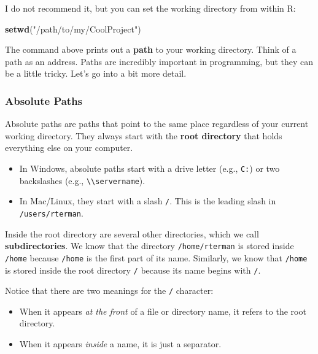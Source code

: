 \documentclass[]{book}
\newenvironment{Shaded}{\begin{snugshade}}{\end{snugshade}}
\newcommand{\KeywordTok}[1]{\textcolor[rgb]{0.13,0.29,0.53}{\textbf{#1}}}
\newcommand{\StringTok}[1]{\textcolor[rgb]{0.31,0.60,0.02}{#1}}
\newcommand{\NormalTok}[1]{#1}
\providecommand{\tightlist}{%
  \setlength{\itemsep}{0pt}\setlength{\parskip}{0pt}}
\begin{document}
I do not recommend it, but you can set the working directory from within
R:

\begin{Shaded}
\begin{Highlighting}[]
\KeywordTok{setwd}\NormalTok{(}\StringTok{"/path/to/my/CoolProject"}\NormalTok{)}
\end{Highlighting}
\end{Shaded}

The command above prints out a \textbf{path} to your working directory.
Think of a path as an address. Paths are incredibly important in
programming, but they can be a little tricky. Let's go into a bit more
detail.

\subsubsection*{Absolute Paths}\label{absolute-paths}

Absolute paths are paths that point to the same place regardless of your
current working directory. They always start with the \textbf{root
directory} that holds everything else on your computer.

\begin{itemize}
\tightlist
\item
  In Windows, absolute paths start with a drive letter (e.g.,
  \texttt{C:}) or two backslashes (e.g.,
  \texttt{\textbackslash{}\textbackslash{}servername}).
\item
  In Mac/Linux, they start with a slash \texttt{/}. This is the leading
  slash in \texttt{/users/rterman}.
\end{itemize}

Inside the root directory are several other directories, which we call
\textbf{subdirectories}. We know that the directory
\texttt{/home/rterman} is stored inside \texttt{/home} because
\texttt{/home} is the first part of its name. Similarly, we know that
\texttt{/home} is stored inside the root directory \texttt{/} because
its name begins with \texttt{/}.

Notice that there are two meanings for the \texttt{/} character:

\begin{itemize}
\tightlist
\item
  When it appears \emph{at the front} of a file or directory name, it
  refers to the root directory.
\item
  When it appears \emph{inside} a name, it is just a separator.
\end{itemize}
\end{document}
